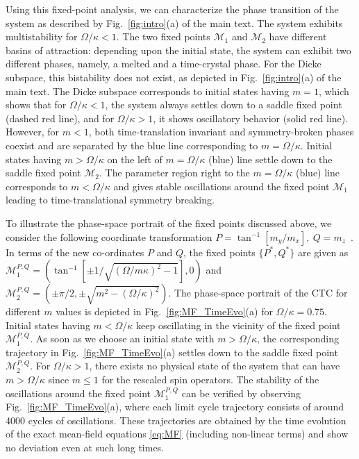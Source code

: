 \documentclass[pra,aps,twocolumn,superscriptaddress,notitlepage]{revtex4-1}
\begin{document}
	Using this fixed-point analysis, we can characterize the phase transition of the system as described by Fig.~\ref{fig:intro}(a) of the main text.
	The system exhibits multistability for $\Omega/\kappa<1$. The two fixed points $\mathcal{M}_1$ and $\mathcal{M}_2$ have different basins of attraction: 
	depending upon the initial state, the system can exhibit two different phases, namely, a melted and a time-crystal phase.
	For the Dicke subspace, this bistability does not exist, as depicted in Fig.~\ref{fig:intro}(a) of the main text.
	The Dicke subspace corresponds to initial states having $m=1$, which shows that for $\Omega/\kappa<1$, the system always settles down to a saddle fixed point (dashed red line), and for $\Omega/\kappa>1$, it shows oscillatory behavior (solid red line). 
	However, for $m<1$, both time-translation invariant and symmetry-broken phases coexist and are separated by the blue line corresponding to $m=\Omega/\kappa$.
	Initial states having $m > \Omega/\kappa$ on the left of $m=\Omega/\kappa$ (blue) line settle down to the saddle fixed point $\mathcal{M}_2$. 
	The parameter region right to the $m=\Omega/\kappa$ (blue) line corresponds to $m<\Omega/\kappa$ and gives stable oscillations around the fixed point $\mathcal{M}_1$ leading to 
	time-translational symmetry breaking.
	
	
	To illustrate the phase-space portrait of the fixed points discussed above, we consider the following coordinate transformation $P=\tan^{-1}\left[ m_y/m_x \right],~Q=m_z$~\cite{iemini2018boundary}. 
	In terms of the new co-ordinates $P$ and $Q$, the fixed points $\{P^*,Q^*\}$ are given as $\mathcal{M}^{P,Q}_1= (\tan^{-1}[\pm 1/\sqrt{(\Omega/m\kappa)^2-1}],0 )$ and $\mathcal{M}^{P,Q}_2=(\pm\pi/2,\pm\sqrt{m^2-(\Omega/\kappa)^2})$. 
	The phase-space portrait of the CTC for different $m$ values is depicted in Fig.~\ref{fig:MF_TimeEvo}(a) for $\Omega/\kappa=0.75$.
	Initial states having $m<\Omega/\kappa$ keep oscillating in the vicinity of the fixed point $\mathcal{M}^{P,Q}_1$. 
	As soon as we choose an initial state with $m>\Omega/\kappa$, the corresponding trajectory in Fig.~\ref{fig:MF_TimeEvo}(a) settles down to the saddle fixed point $\mathcal{M}^{P,Q}_2$. For $\Omega/\kappa>1$, there exists no physical state of the system that can have $m>\Omega/\kappa$ since $m\leq 1$ for the rescaled spin operators. 
	The stability of the oscillations around the fixed point $\mathcal{M}_1^{P,Q}$ can be verified by observing Fig.~\ref{fig:MF_TimeEvo}(a), where each limit cycle trajectory consists of around 4000 cycles of oscillations. These trajectories are obtained by the time evolution of the exact mean-field equations \eqref{eq:MF} (including non-linear terms) and show no deviation even at such long times.
	
\end{document}
